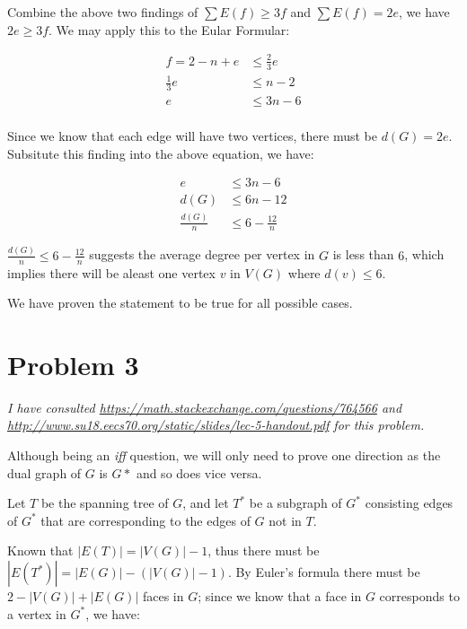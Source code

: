 \documentclass[11pt]{article}
\begin{document}
Combine the above two findings of $\sum E(f) \geq 3f$ and $\sum E(f) = 2e$, we have $2e \geq 3f $. We may apply this to the Eular Formular:

\begin{align*}
    f = 2 - n + e &\leq \frac{2}{3}e \\
    \frac{1}{3}e &\leq n - 2 \\
    e &\leq 3n - 6\\
\end{align*}

Since we know that each edge will have two vertices, there must be $d(G) = 2e$. Subsitute this finding into the above equation, we have:


\begin{align*}
e &\leq 3n - 6\\
d(G) &\leq 6n - 12 \\
\frac{d(G)}{n} &\leq 6 - \frac{12}{n}
\end{align*}

$\frac{d(G)}{n} \leq 6 - \frac{12}{n}$ suggests the average degree per vertex in $G$ is less than $6$, which implies there will be aleast one vertex $v$ in $V(G)$ where $d(v) \leq 6$.\newline

We have proven the statement to be true for all possible cases.




\section*{Problem 3}

\textit{I have consulted \url{https://math.stackexchange.com/questions/764566} and \url{http://www.su18.eecs70.org/static/slides/lec-5-handout.pdf} for this problem.}
\newline

Although being an \textit{iff} question, we will only need to prove one direction as the dual graph of $G$ is $G*$ and so does vice versa.\newline

Let $T$ be the spanning tree of $G$, and let $T^*$ be a subgraph of $G^*$ consisting edges of $G^*$ that are corresponding to the edges of $G$ not in $T$.

Known that $|E(T)| = |V(G)| - 1$, thus there must be $|E(T^*)| = |E(G)| - (|V(G)| - 1)$. By Euler's formula there must be $2 - |V(G)| + |E(G)|$ faces in $G$; since we know that a face in $G$ corresponds to a vertex in $G^*$, we have:
\end{document}

